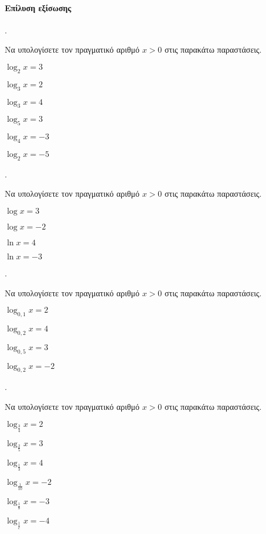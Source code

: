 \documentclass[11pt,a4paper,twocolumn]{article}
\newcounter{askhsh}
\newcommand{\askhsh}{\large\theaskhsh.\ \addtocounter{askhsh}{1}}
\begin{document}
\paragraph{Επίλυση εξίσωσης}
\askhsh Να υπολογίσετε τον πραγματικό αριθμό $ x>0 $ στις παρακάτω παραστάσεις.
\begin{multicols}{2}
\begin{alist}
\item $ \log_{2}{x}=3 $
\item $ \log_{3}{x}=2 $
\item $ \log_{3}{x}=4 $
\item $ \log_{5}{x}=3 $
\item $ \log_{4}{x}=-3 $
\item $ \log_{2}{x}=-5 $
\end{alist}
\end{multicols}
\askhsh Να υπολογίσετε τον πραγματικό αριθμό $ x>0 $ στις παρακάτω παραστάσεις.
\begin{multicols}{2}
\begin{alist}
\item $ \log{x}=3 $
\item $ \log{x}=-2 $
\item $ \ln{x}=4 $
\item $ \ln{x}=-3 $
\end{alist}
\end{multicols}
\askhsh Να υπολογίσετε τον πραγματικό αριθμό $ x>0 $ στις παρακάτω παραστάσεις.
\begin{multicols}{2}
\begin{alist}
\item $ \log_{0{,}1}{x}=2 $
\item $ \log_{0{,}2}{x}=4 $
\item $ \log_{0{,}5}{x}=3 $
\item $ \log_{0{,}2}{x}=-2 $
\end{alist}
\end{multicols}
\askhsh Να υπολογίσετε τον πραγματικό αριθμό $ x>0 $ στις παρακάτω παραστάσεις.
\begin{multicols}{2}
\begin{alist}
\item $ \log_{\frac{3}{4}}{x}=2 $
\item $ \log_{\frac{2}{5}}{x}=3 $
\item $ \log_{\frac{1}{3}}{x}=4 $
\item $ \log_{\frac{1}{10}}{x}=-2 $
\item $ \log_{\frac{1}{8}}{x}=-3 $
\item $ \log_{\frac{1}{e}}{x}=-4 $
\end{alist}
\end{multicols}
\end{document}
